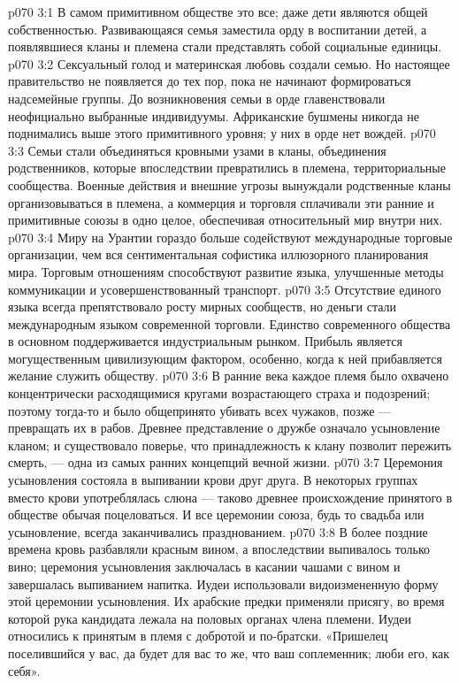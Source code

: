 \vs p070 3:1 В самом примитивном обществе  это все; даже дети являются общей собственностью. Развивающаяся семья заместила орду в воспитании детей, а появлявшиеся кланы и племена стали представлять собой социальные единицы.
\vs p070 3:2 Сексуальный голод и материнская любовь создали семью. Но настоящее правительство не появляется до тех пор, пока не начинают формироваться надсемейные группы. До возникновения семьи в орде главенствовали неофициально выбранные индивидуумы. Африканские бушмены никогда не поднимались выше этого примитивного уровня; у них в орде нет вождей.
\vs p070 3:3 \pc Семьи стали объединяться кровными узами в кланы, объединения родственников, которые впоследствии превратились в племена, территориальные сообщества. Военные действия и внешние угрозы вынуждали родственные кланы организовываться в племена, а коммерция и торговля сплачивали эти ранние и примитивные союзы в одно целое, обеспечивая относительный мир внутри них.
\vs p070 3:4 Миру на Урантии гораздо больше содействуют международные торговые организации, чем вся сентиментальная софистика иллюзорного планирования мира. Торговым отношениям способствуют развитие языка, улучшенные методы коммуникации и усовершенствованный транспорт.
\vs p070 3:5 Отсутствие единого языка всегда препятствовало росту мирных сообществ, но деньги стали международным языком современной торговли. Единство современного общества в основном поддерживается индустриальным рынком. Прибыль является могущественным цивилизующим фактором, особенно, когда к ней прибавляется желание служить обществу.
\vs p070 3:6 \pc В ранние века каждое племя было охвачено концентрически расходящимися кругами возрастающего страха и подозрений; поэтому тогда\hyp{}то и было общепринято убивать всех чужаков, позже --- превращать их в рабов. Древнее представление о дружбе означало усыновление кланом; и существовало поверье, что принадлежность к клану позволит пережить смерть, --- одна из самых ранних концепций вечной жизни.
\vs p070 3:7 Церемония усыновления состояла в выпивании крови друг друга. В некоторых группах вместо крови употреблялась слюна --- таково древнее происхождение принятого в обществе обычая поцеловаться. И все церемонии союза, будь то свадьба или усыновление, всегда заканчивались празднованием.
\vs p070 3:8 В более поздние времена кровь разбавляли красным вином, а впоследствии выпивалось только вино; церемония усыновления заключалась в касании чашами с вином и завершалась выпиванием напитка. Иудеи использовали видоизмененную форму этой церемонии усыновления. Их арабские предки применяли присягу, во время которой рука кандидата лежала на половых органах члена племени. Иудеи относились к принятым в племя с добротой и по\hyp{}братски. «Пришелец поселившийся у вас, да будет для вас то же, что ваш соплеменник; люби его, как себя».
